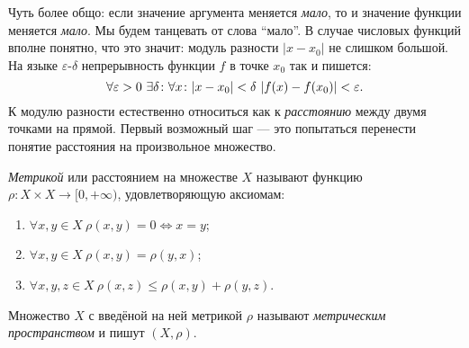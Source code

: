 Чуть более общо: если значение аргумента меняется \textit{мало}, то и значение функции меняется \textit{мало}. Мы будем танцевать от слова ``мало''. В случае числовых функций вполне понятно, что это значит: модуль разности $|x-x_0|$ не слишком большой. На языке $\varepsilon$-$\delta$ непрерывность функции $f$ в точке $x_0$ так и пишется:
	\begin{equation}
		\forall\varepsilon>0\ \exists\delta\such\forall x\such |x-x_0|<\delta\ |f(x)-f(x_0)|<\varepsilon.
	\end{equation}
К модулю разности естественно относиться как к \textit{расстоянию} между двумя точками на прямой. Первый возможный шаг --- это попытаться перенести понятие расстояния на произвольное множество.
\begin{defin}
	\textit{Метрикой} или расстоянием на множестве $X$ называют функцию $\rho\colon X\times X\to[0,+\infty)$, удовлетворяющую аксиомам:
		\begin{enumerate}
			\item $\forall x,y\in X\ \rho(x,y)=0\Leftrightarrow x=y$;
			\item $\forall x,y\in X\ \rho(x,y)=\rho(y,x)$;
			\item $\forall x,y,z\in X\ \rho(x,z)\leqslant\rho(x,y)+\rho(y,z)$.
		\end{enumerate}
Множество $X$ с введёной на ней метрикой $\rho$ называют \textit{метрическим пространством} и пишут $(X,\rho)$.
\end{defin}

